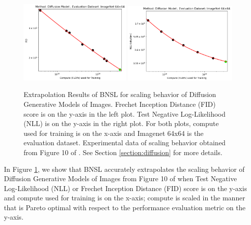 \documentclass{article} %
\begin{document}
\begin{figure}[htbp]
    \centering
\includegraphics[width=0.492\textwidth]{figures/diffusion/diffusion__fid.png}
\includegraphics[width=0.497\textwidth]{figures/diffusion/diffusion__nll.png}

    \caption{
Extrapolation Results of BNSL for scaling behavior of Diffusion Generative Models of Images. Frechet Inception Distance (FID) score is on the y-axis in the left plot. Test Negative Log-Likelihood (NLL) is on the y-axis in the right plot. For both plots, compute used for training is on the x-axis and Imagenet 64x64 is the evaluation dataset. Experimental data of scaling behavior obtained from Figure 10 of \cite{nichol2021improved}. See Section \ref{section:diffusion} for more details.
    }
    \label{fig:diffusion_compute_scaling}
\end{figure}

In Figure \ref{fig:diffusion_compute_scaling}, we show that BNSL accurately extrapolates the scaling behavior of Diffusion Generative Models of Images from Figure 10 of \cite{nichol2021improved} when Test Negative Log-Likelihood (NLL) or Frechet Inception Distance (FID) score is on the y-axis and compute used for training is on the x-axis; compute is scaled in the manner that is Pareto optimal with respect to the performance evaluation metric on the y-axis.

\fi

\vspace*{-19.3mm}
\end{document}
